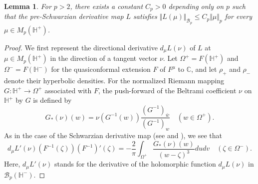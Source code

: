 \documentclass[amstex,12pt,reqno]{amsart}
\newtheorem{lemma}[theorem]{Lemma}
\theoremstyle{definition}
\begin{document}
\begin{lemma}\label{P-bdd}
For $p>2$, there exists a constant $C_p>0$ depending only on $p$ such that 
the pre-Schwarzian derivative map $L$
satisfies $\Vert L(\mu) \Vert_{{\mathcal B}_p} \leq C_p \Vert \mu \Vert_p$ for
every $\mu \in M_p(\mathbb H^+)$. 
\end{lemma}

\begin{proof}
We first represent the directional derivative $d_\mu L(\nu)$ of $L$ at $\mu \in M_p(\mathbb H^+)$ in the direction of 
a tangent vector $\nu$. 
Let $\Omega^+=F(\mathbb H^+)$ and $\Omega^-=F(\mathbb H^-)$ for the quasiconformal extension $F$ of $F^\mu$
to $\mathbb C$, and let $\rho_+$ and $\rho_-$ denote
their hyperbolic densities. For the normalized Riemann mapping $G:\mathbb H^+ \to \Omega^+$
associated with $F$,
the push-forward of the Beltrami coefficient $\nu$ on $\mathbb H^+$ by $G$
is defined by
$$
G_*(\nu)(w)=\nu(G^{-1}(w))\frac{(G^{-1})_{\bar w}}{(G^{-1})_{w}} \quad (w \in \Omega^+).
$$
As in the case of the Schwarzian derivative map (see \cite[Lemma 5]{Har} and \cite[Theorem I.2.3]{TT}), we see that
\begin{equation}\label{derivative}
d_\mu L'(\nu)(F^{-1}(\zeta))(F^{-1})'(\zeta)=-\frac{2}{\pi} \int_{\Omega^+} \frac{G_*(\nu)(w)}{(w-\zeta)^3}dudv 
\quad (\zeta \in \Omega^-).
\end{equation}
Here, $d_\mu L'(\nu)$ stands for the derivative of the holomorphic function $d_\mu L(\nu)$ in ${\mathcal B}_p(\mathbb H^-)$.


\end{proof}
\end{document}
